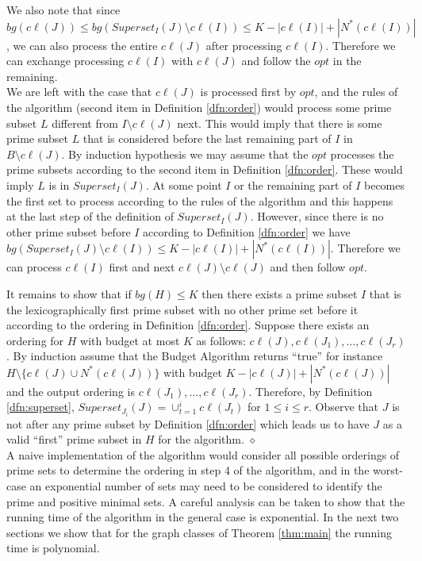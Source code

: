 \documentclass[letterpaper,11pt,abstracton]{scrartcl}
\newcommand{\qed}{\hfill$\diamond$}
\begin{document}
We also note that since $bg( c\ell(J))  \le bg( Superset_{I}(J) \setminus c\ell(I) ) \le K- | c\ell(I)|+|N^*(c\ell(I))|$, we can also process
the entire $c\ell(J)$ after processing $c\ell(I)$. Therefore we can exchange processing $c\ell(I)$ with $c\ell(J)$ and follow the
$opt$ in the remaining. \\



We are left with the case that $c\ell(J)$ is processed first by $opt$, and the rules
of the algorithm (second item in Definition \ref{dfn:order}) would process some prime subset $L$ different from $I \setminus c\ell(J)$ next.
This would imply that there is some prime subset $L$ that is considered before the last remaining part of $I$ in $B \setminus c\ell(J)$.
By induction hypothesis we may assume that the $opt$ processes the prime subsets according to the second item in Definition \ref{dfn:order}.
These would imply $L$ is in $Superset_{I}(J)$.  At some point $I$ or the remaining part of $I$ becomes the first set to process according to
the rules of the algorithm and this happens at the last step of the definition of  $Superset_{I}(J)$.
However, since there is no other prime subset before $I$ according to Definition \ref{dfn:order} we have
$bg( Superset_{I}(J) \setminus  c\ell(I)) \le K- |c\ell(I)|+|N^*( c\ell(I))|$. Therefore  we can process  $c\ell(I)$ first and next
$c\ell(J) \setminus c\ell(J)$ and then follow $opt$.

It remains to show that if $bg(H)\leq K$ then there exists a prime subset $I$
that is the lexicographically first prime subset with no other
prime set before it according to the ordering in Definition \ref{dfn:order}.
Suppose there exists an ordering for $H$ with budget at most
$K$ as follows: $c\ell(J), c\ell(J_1),\dots , c\ell(J_r)$.
By induction assume that the Budget Algorithm returns ``true'' for
instance $H\setminus \lbrace c\ell(J)\cup N^*(c\ell(J))\rbrace$ with
budget $K-|c\ell(J)|+ |N^*(c\ell(J))|$ and the output ordering is
$c\ell(J_1),\dots , c\ell(J_r)$. Therefore, by Definition
\ref{dfn:superset}, $Superset_{J_i}(J)=\cup_{t=1}^{i}c\ell(J_t)$ for
$1\leq i\leq r$. Observe that $J$ is not after any prime subset
by Definition \ref{dfn:order} which leads us to have $J$ as a valid
``first'' prime subset in $H$ for the algorithm.
\qed \\



A naive implementation of the algorithm would consider all possible
orderings of prime sets to determine the ordering in step 4 of the algorithm, and
in the worst-case an exponential number of sets may need to be considered to
identify the prime and positive minimal sets.  A careful analysis can be taken
to show that the running time of the algorithm in the general case is
exponential.  In the next two sections we show that for the graph classes
of Theorem \ref{thm:main} the running time is polynomial.
\end{document}
